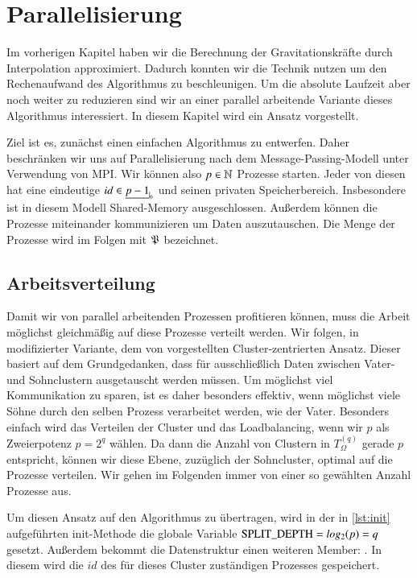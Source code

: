 \section{Parallelisierung}
\label{sec:parallelpart}
  Im vorherigen Kapitel haben wir die Berechnung der Gravitationskräfte durch Interpolation approximiert. Dadurch konnten wir die Technik \hquad nutzen um den Rechenaufwand des Algorithmus zu 
  beschleunigen.
  Um die absolute Laufzeit aber noch weiter zu reduzieren sind wir an einer parallel arbeitende Variante dieses Algorithmus interessiert. In diesem Kapitel wird ein Ansatz vorgestellt.
  
  Ziel ist es, zunächst einen einfachen Algorithmus zu entwerfen. Daher beschränken wir uns auf Parallelisierung nach dem Message-Passing-Modell unter Verwendung von MPI. Wir können also 
  $p \in \mathbb{N}$ Prozesse starten. Jeder von diesen hat eine eindeutige $id \in \nullhaken{p-1}$ und seinen privaten Speicherbereich. Insbesondere ist in diesem Modell Shared-Memory ausgeschlossen. 
  Außerdem können die Prozesse miteinander kommunizieren um Daten auszutauschen. Die Menge der Prozesse wird im Folgen mit $\mathfrak{P}$ bezeichnet.

  
  \subsection{Arbeitsverteilung}
  \label{sec:work}
    Damit wir von parallel arbeitenden Prozessen profitieren können, muss die Arbeit möglichst gleichmäßig auf diese Prozesse verteilt werden. Wir folgen, in modifizierter Variante, dem von 
    \citet{distrh2} vorgestellten Cluster-zentrierten Ansatz. 
    Dieser basiert auf dem Grundgedanken, dass für \vorruck ausschließlich Daten zwischen Vater- und Sohnclustern ausgetauscht werden müssen. Um möglichst viel Kommunikation zu sparen, ist es daher
    besonders effektiv, wenn möglichst viele Söhne durch den selben Prozess verarbeitet werden, wie der Vater. Besonders einfach wird das Verteilen der Cluster und das Loadbalancing, wenn wir $p$ als 
    Zweierpotenz $p = 2^q$ wählen. Da dann die Anzahl von Clustern in $T_\Omega^{(q)}$ gerade $p$ entspricht, können wir diese Ebene, zuzüglich der Sohncluster, optimal auf die Prozesse verteilen.
    Wir gehen im Folgenden immer von einer so gewählten Anzahl Prozesse aus.
    
    Um diesen Ansatz auf den Algorithmus zu übertragen, wird in der in \autoref{lst:init} aufgeführten init-Methode die globale Variable $\tcode{SPLIT_DEPTH} = log_2(p) = q$ gesetzt. 
    Außerdem bekommt die Datenstruktur  einen weiteren Member: . In diesem  wird die $id$ des für dieses Cluster zuständigen Prozesses gespeichert.
    
